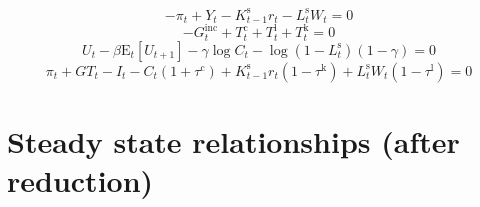 \begin{equation}
-\pi_{t} + Y_{t} - {K^{\mathrm{s}}_{t-1}} {r_{t}} - {L^{\mathrm{s}}_{t}} {W_{t}} = 0
\end{equation}
\begin{equation}
-G^{\mathrm{inc}}_{t} + T^{\mathrm{c}}_{t} + T^{\mathrm{l}}_{t} + T^{\mathrm{k}}_{t} = 0
\end{equation}
\begin{equation}
U_{t} - {\beta} {\mathrm{E}_{t}\left[U_{t+1}\right]} - {\gamma} {\log{C_{t}}} - {\log\left(1 - L^{\mathrm{s}}_{t}\right)} \left(1 - \gamma\right) = 0
\end{equation}
\begin{equation}
\pi_{t} + {G\!T}_{t} - I_{t} - {C_{t}} \left(1 + \tau^{\mathrm{c}}\right) + {K^{\mathrm{s}}_{t-1}} {r_{t}} \left(1 - \tau^{\mathrm{k}}\right) + {L^{\mathrm{s}}_{t}} {W_{t}} \left(1 - \tau^{\mathrm{l}}\right) = 0
\end{equation}



\section{Steady state relationships (after reduction)}

